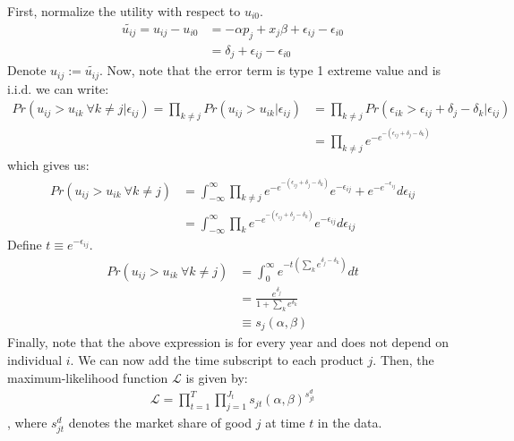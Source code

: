 \documentclass[11pt,letterpaper]{article}
\begin{document}
First, normalize the utility with respect to $u_{i0}$.
\begin{align*}
  \widetilde{u_{ij}} = u_{ij} - u_{i0} &= - \alpha p_j + x_j \beta + \epsilon_{ij} - \epsilon_{i0}\\
                  &= \delta_j +  \epsilon_{ij} - \epsilon_{i0}
\end{align*}
Denote $u_{ij} := \widetilde{u_{ij}}$. Now, note that the error term
is type 1 extreme value and is i.i.d. we can write:
\begin{align*}
  Pr(u_{ij}>u_{ik} \ \forall k \neq j | \epsilon_{ij}) 
  = \prod_{k \neq j} Pr(u_{ij}>u_{ik} | \epsilon_{ij}) &= \prod_{k \neq j} Pr(\epsilon_{ik}>\epsilon_{ij} + \delta_j - \delta_k | \epsilon_{ij}) \\
  &= \prod_{k \neq j} e^{-e^{-(\epsilon_{ij} + \delta_j - \delta_k)}}
\end{align*}
which gives us:
\begin{align*}
  Pr(u_{ij}>u_{ik} \ \forall k \neq j) 
  &= \int_{-\infty}^{\infty} \prod_{k \neq j} e^{-e^{-(\epsilon_{ij} + \delta_j - \delta_k)}} e^{-\epsilon_{ij}} + e^{-e^{-\epsilon_{ij}}} d {\epsilon_{ij}} \\
  &= \int_{-\infty}^{\infty} \prod_{k} e^{-e^{-(\epsilon_{ij} + \delta_j - \delta_k)}} e^{-\epsilon_{ij}} d {\epsilon_{ij}}
\end{align*}
Define $t \equiv e^{-\epsilon_{ij}}$.
\begin{align*}
  Pr(u_{ij}>u_{ik} \ \forall k \neq j) 
  &= \int^\infty_0 e^{-t(\sum_k e^{\delta_j -\delta_k})} dt \\
  &= \frac{e^{\delta_j}}{1 + \sum_k e^{\delta_k}} \\
  &\equiv s_j (\alpha, \beta)
\end{align*}
Finally, note that the above expression is for every year and does not
depend on individual $i$. We can now add the time subscript to each
product $j$. Then, the maximum-likelihood function $\mathscr{L}$ is
given by:
\begin{align*}
  \mathscr{L} =  \prod_{t=1}^{T} \prod_{j=1}^{J_t} s_{jt}(\alpha, \beta)^{s^d_{jt}} 
\end{align*}
, where $s^d_{jt}$ denotes the market share of good $j$ at time $t$ in
the data.
\end{document}
